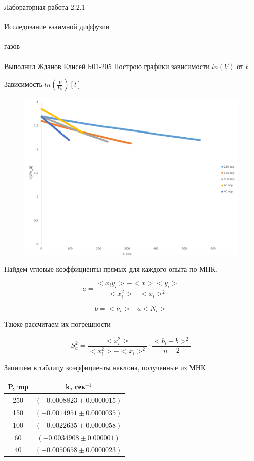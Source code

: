 \documentclass{astroedu-lab}
\begin{document}
\begin{problem}{\huge Лабораторная работа 2.2.1\\\\Исследование взаимной диффузии\\\\газов\\\\Выполнил Жданов Елисей Б01-205}
Построю графики зависимости $ln(V)$ от $t$.

\begin{center}
	\Large Зависимость $ln(\frac{V}{V_0})[t]$
\end{center}

\begin{figure}[!h]
	\centering
	\includegraphics[width=1\textwidth]{логарифм.png}
	\label{fig:boiler}
\end{figure}

Найдем угловые коэффициенты прямых для каждого опыта по МНК.

\[
	a = \frac{<x_i y_i> - < x > < y_i >}{< x_i^2> - < x_i >^2}
\]

\[
	b = < \nu_i > - a < N_i >
\]

Также рассчитаем их погрешности

\begin{equation}
	S_a^2 = \frac{< x_i^2>}{< x_i^2 > - < x_i >^2} \cdot \frac{<  b_i - b > ^2}{n - 2}
\end{equation}


Запишем в таблицу коэффициенты наклона, полученные из МНК

\begin{center}
\begin{tabular}{|c|c|}
\hline 
P, тор & k, сек$^{-1}$ \\
\hline
250 & $(-0.0008823 \pm 0.0000015)$ \\
150 & $(-0.0014951 \pm 0.0000035)$ \\
100 & $(-0.0022635 \pm 0.0000058)$ \\
60 & $(-0.0034908 \pm 0.000001)$ \\
40 & $(-0.0050658 \pm 0.0000023)$ \\
\hline
\end{tabular}
\end{center}


\end{problem}
\end{document}
